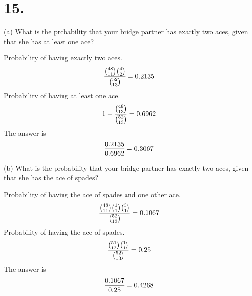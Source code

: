 \section*{15.}
(a) What is the probability that your bridge partner has exactly two aces,
given that she has at least one ace?

\bigskip
\noindent
Probability of having exactly two aces.
$${{48\choose11}{4\choose2}\over{52\choose13}}=0.2135$$
Probability of having at least one ace.
$$1-{{48\choose13}\over{52\choose13}}=0.6962$$
The answer is
$${0.2135\over0.6962}=0.3067$$

\bigskip
\noindent
(b) What is the probability that your bridge partner has exactly two aces,
given that she has the ace of spades?

\bigskip
\noindent
Probability of having the ace of spades and one other ace.
$${{48\choose11}{1\choose1}{3\choose1}\over{52\choose13}}=0.1067$$
Probability of having the ace of spades.
$${{51\choose12}{1\choose1}\over{52\choose13}}=0.25$$
The answer is
$${0.1067\over0.25}=0.4268$$

